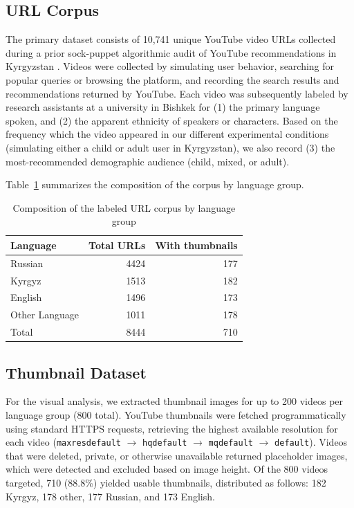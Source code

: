 \documentclass[12pt, letterpaper]{article}
\begin{document}
\subsection{URL Corpus}

The primary dataset consists of 10,741 unique YouTube video URLs collected during a prior sock-puppet algorithmic audit of YouTube recommendations in Kyrgyzstan \citep{escher2026empire}. Videos were collected by simulating user behavior, searching for popular queries or browsing the platform, and recording the search results and recommendations returned by YouTube. Each video was subsequently labeled by research assistants at a university in Bishkek for (1) the primary language spoken, and (2) the apparent ethnicity of speakers or characters. Based on the frequency which the video appeared in our different experimental conditions (simulating either a child or adult user in Kyrgyzstan), we also record (3) the most-recommended demographic audience (child, mixed, or adult).

Table~\ref{tab:corpus} summarizes the composition of the corpus by language group.

\begin{table}[H]
\centering
\caption{Composition of the labeled URL corpus by language group}
\label{tab:corpus}
\begin{tabular}{lrr}
\toprule
\textbf{Language} & \textbf{Total URLs} & \textbf{With thumbnails} \\
\midrule
Russian  & 4424 & 177 \\
Kyrgyz   & 1513 & 182 \\
English  & 1496 & 173 \\
Other Language    & 1011 & 178 \\
\midrule
Total    & 8444  & 710 \\
\bottomrule
\end{tabular}
\end{table}

\subsection{Thumbnail Dataset}

For the visual analysis, we extracted thumbnail images for up to 200 videos per language group (800 total). YouTube thumbnails were fetched programmatically using standard HTTPS requests, retrieving the highest available resolution for each video (\texttt{maxresdefault} $\rightarrow$ \texttt{hqdefault} $\rightarrow$ \texttt{mqdefault} $\rightarrow$ \texttt{default}). Videos that were deleted, private, or otherwise unavailable returned placeholder images, which were detected and excluded based on image height. Of the 800 videos targeted, 710 (88.8\%) yielded usable thumbnails, distributed as follows: 182 Kyrgyz, 178 other, 177 Russian, and 173 English.
\end{document}
